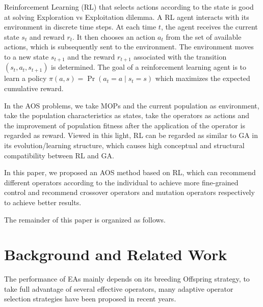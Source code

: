\documentclass[journal]{IEEEtran}
\newcommand{\TODO}[1]{\textcolor[rgb]{1.00,0.40,0.22}{#1}}
\begin{document}
Reinforcement Learning (RL) that selects actions according to the state is good at solving Exploration vs Exploitation dilemma.
A RL agent interacts with its environment in discrete time steps. At each time $t$, the agent receives the current state $s_t$ and reward $r_t$. It then chooses an action $a_t$ from the set of available actions, which is subsequently sent to the environment. The environment moves to a new state $s_{t+1}$ and the reward $r_{t+1}$ associated with the transition $(s_t, a_t, s_{t+1})$ is determined. The goal of a reinforcement learning agent is to learn a policy $\pi(a, s)=\operatorname{Pr}\left(a_{t}=a \mid s_{t}=s\right)$ which maximizes the expected cumulative reward.

In the AOS problems, we take MOPs and the current population as environment, take the population characteristics as states, take the operators as actions and the improvement of population fitness after the application of the operator is regarded as reward.
Viewed in this light, RL can be regarded as similar to GA in its evolution/learning structure, which causes high conceptual and structural compatibility between RL and GA.

In this paper, we proposed an AOS method based on RL, which can recommend different operators according to the individual to achieve more fine-grained control and recommend crossover operators and mutation operators respectively to achieve better results.

\TODO{The remainder of this paper is organized as follows.}

\IEEEpubidadjcol

\section{Background and Related Work}
The performance of EAs mainly depends on its breeding Offspring strategy, to take full advantage of several effective operators, many adaptive operator selection strategies have been proposed in recent years.
\end{document}
